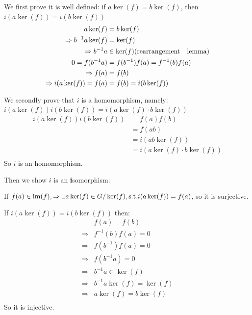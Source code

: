 \documentclass[]{ctexart}
\begin{document}
		We first prove it is well defined: if $a\operatorname{ker}(f)=b\operatorname{ker}(f)$, then $i(a\operatorname{ker}(f))=i(b\operatorname{ker}(f))$
		\begin{equation*}
		\begin{aligned}
		a\operatorname{ker}(f)&=b\operatorname{ker}(f)\\
		\Rightarrow b^{-1}a\operatorname{ker}(f)&=\operatorname{ker}(f)\\
		\Rightarrow b^{-1}a&\in \operatorname{ker}(f)\rm{(rearrangement\quad lemma)}\\ 
		0=f(b^{-1}a)&=f(b^{-1})f(a)=f^{-1}(b)f(a)\\
		\Rightarrow f(a)&=f(b)\\
		\Rightarrow i(a\operatorname{ker}(f))=f(a)&=f(b)=i(b\operatorname{ker}(f))
		\end{aligned}
		\end{equation*}
		
		We secondly prove that $ i $ is a homomorphism, namely:$ i(a\operatorname{ker}(f))i(b\operatorname{ker}(f))=i(a\operatorname{ker}(f)\cdot b\operatorname{ker}(f)) $
		\begin{equation*}
		\begin{aligned}
		i(a\operatorname{ker}(f))i(b\operatorname{ker}(f))&=f(a)f(b)\\
		&=f(ab)\\
		&=i(ab\operatorname{ker}(f))\\
		&=i(a\operatorname{ker}(f)\cdot b\operatorname{ker}(f))\\
		\end{aligned}
		\end{equation*}
		So $ i $ is an homomorphism.
		
		Then we show $ i $ is an \textbf{i}somorphism:
		
		If $ f(a)\in \operatorname{im}(f), \Rightarrow \exists a\operatorname{ker}(f)\in G/\operatorname{ker}(f),{\rm s.t. } i(a\operatorname{ker}(f))=f(a)$, so it is surjective. 
		
		If $ i(a\operatorname{ker}(f))=i(b\operatorname{ker}(f)) $
		then:
		\begin{equation*}
		\begin{aligned}
		&f(a)=f(b)\\
		\Rightarrow &f^{-1}(b)f(a)=0\\
		\Rightarrow &f(b^{-1})f(a)=0\\
		\Rightarrow &f(b^{-1}a)=0\\
		\Rightarrow &b^{-1}a\in \operatorname{ker}(f)\\
		\Rightarrow &b^{-1}a\operatorname{ker}(f)=\operatorname{ker}(f)\\
		\Rightarrow &a\operatorname{ker}(f)=b\operatorname{ker}(f)\\
		\end{aligned}
		\end{equation*}
		So it is injective.
		
\end{document}
